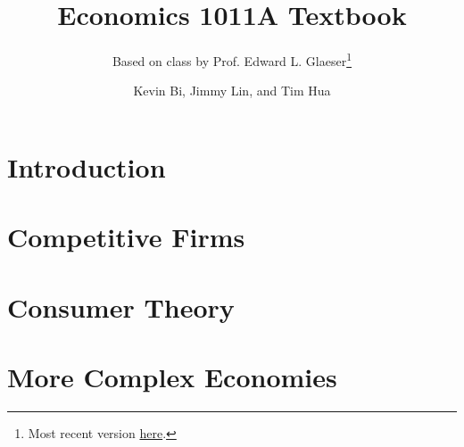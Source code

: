 \documentclass[12pt,twoside=false,openright,numbers=noenddot]{scrbook}
\title{Economics 1011A Textbook}
\subtitle{Based on class by Prof. Edward L. Glaeser\footnote{Most recent version \href{https://github.com/tim-hua-01/ECON-1011A-Textbook/blob/master/textbook.pdf}{here}.}}
\author{Kevin Bi, Jimmy Lin, and Tim Hua}
\begin{document}
\maketitle
\tableofcontents

\part{Introduction}




\part{Competitive Firms}



\part{Consumer Theory}





\part{More Complex Economies}





\end{document}
